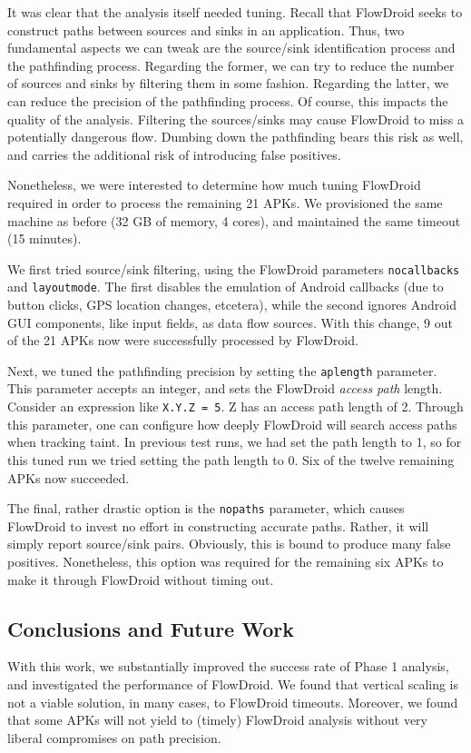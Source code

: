 It was clear that the analysis itself needed tuning.  Recall that FlowDroid seeks to construct paths between sources and sinks in an application.  Thus, two fundamental aspects we can tweak are the source/sink identification process and the pathfinding process.  Regarding the former, we can try to reduce the number of sources and sinks by filtering them in some fashion.  Regarding the latter, we can reduce the precision of the pathfinding process.  Of course, this impacts the quality of the analysis.  Filtering the sources/sinks may cause FlowDroid to miss a potentially dangerous flow.  Dumbing down the pathfinding bears this risk as well, and carries the additional risk of introducing false positives. 

Nonetheless, we were interested to determine how much tuning FlowDroid required in order to process the remaining 21 APKs.  We provisioned the same machine as before (32 GB of memory, 4 cores), and maintained the same timeout (15 minutes).  

We first tried source/sink filtering, using the FlowDroid parameters \texttt{nocallbacks} and \texttt{layoutmode}.  The first disables the emulation of Android callbacks (due to button clicks, GPS location changes, etcetera), while the second ignores Android GUI components, like input fields, as data flow sources.  With this change, 9 out of the 21 APKs now were successfully processed by FlowDroid. 

Next, we tuned the pathfinding precision by setting the \texttt{aplength} parameter.  This parameter accepts an integer, and sets the FlowDroid \emph{access path} length.  Consider an expression like \texttt{X.Y.Z = 5}.  Z has an access path length of 2.  Through this parameter, one can configure how deeply FlowDroid will search access paths when tracking taint.  In previous test runs, we had set the path length to 1, so for this tuned run we tried setting the path length to 0.  Six of the twelve remaining APKs now succeeded. 

The final, rather drastic option is the \texttt{nopaths} parameter, which causes FlowDroid to invest no effort in constructing accurate paths.  Rather, it will simply report source/sink pairs.  Obviously, this is bound to produce many false positives.  Nonetheless, this option was required for the remaining six APKs to make it through FlowDroid without timing out.

\subsection{Conclusions and Future Work}
With this work, we substantially improved the success rate of Phase 1 analysis, and investigated the performance of FlowDroid.  We found that vertical scaling is not a viable solution, in many cases, to FlowDroid timeouts.  Moreover, we found that some APKs will not yield to (timely) FlowDroid analysis without very liberal compromises on path precision.


